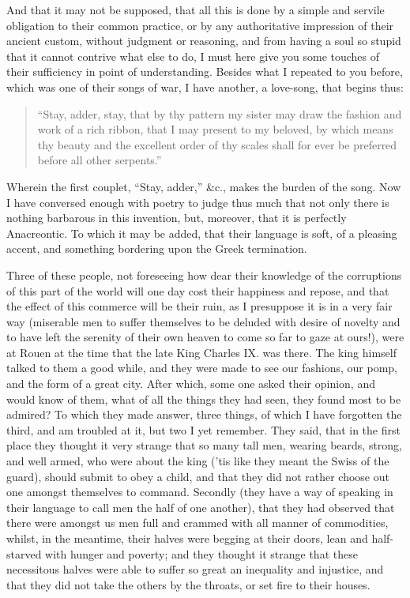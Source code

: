 \documentclass[twocolumn]{article}
\begin{document}
	And that it may not be supposed, that all this is done by a simple and servile obligation to their common practice, or by any authoritative impression of their ancient custom, without judgment or reasoning, and from having a soul so stupid that it cannot contrive what else to do, I must here give you some touches of their sufficiency in point of understanding. Besides what I repeated to you before, which was one of their songs of war, I have another, a love-song, that begins thus:

	\begin{quote}
		``Stay, adder, stay, that by thy pattern my sister may draw the fashion and work of a rich ribbon, that I may present to my beloved, by which means thy beauty and the excellent order of thy scales shall for ever be preferred before all other serpents.''
	\end{quote}
	
	Wherein the first couplet, ``Stay, adder,'' \&c., makes the burden of the song. Now I have conversed enough with poetry to judge thus much that not only there is nothing barbarous in this invention, but, moreover, that it is perfectly Anacreontic. To which it may be added, that their language is soft, of a pleasing accent, and something bordering upon the Greek termination.

	Three of these people, not foreseeing how dear their knowledge of the corruptions of this part of the world will one day cost their happiness and repose, and that the effect of this commerce will be their ruin, as I presuppose it is in a very fair way (miserable men to suffer themselves to be deluded with desire of novelty and to have left the serenity of their own heaven to come so far to gaze at ours!), were at Rouen at the time that the late King Charles IX. was there. The king himself talked to them a good while, and they were made to see our fashions, our pomp, and the form of a great city. After which, some one asked their opinion, and would know of them, what of all the things they had seen, they found most to be admired? To which they made answer, three things, of which I have forgotten the third, and am troubled at it, but two I yet remember. They said, that in the first place they thought it very strange that so many tall men, wearing beards, strong, and well armed, who were about the king (’tis like they meant the Swiss of the guard), should submit to obey a child, and that they did not rather choose out one amongst themselves to command. Secondly (they have a way of speaking in their language to call men the half of one another), that they had observed that there were amongst us men full and crammed with all manner of commodities, whilst, in the meantime, their halves were begging at their doors, lean and half-starved with hunger and poverty; and they thought it strange that these necessitous halves were able to suffer so great an inequality and injustice, and that they did not take the others by the throats, or set fire to their houses.
\end{document}
